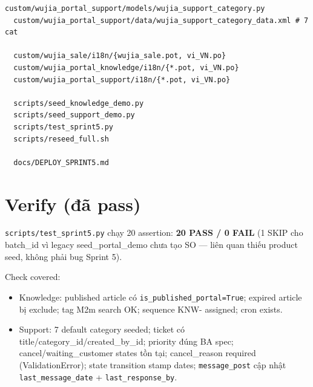 \begin{lstlisting}[style=shell]
  custom/wujia_portal_support/models/wujia_support_category.py
  custom/wujia_portal_support/data/wujia_support_category_data.xml # 7 cat

  custom/wujia_sale/i18n/{wujia_sale.pot, vi_VN.po}
  custom/wujia_portal_knowledge/i18n/{*.pot, vi_VN.po}
  custom/wujia_portal_support/i18n/{*.pot, vi_VN.po}

  scripts/seed_knowledge_demo.py
  scripts/seed_support_demo.py
  scripts/test_sprint5.py
  scripts/reseed_full.sh

  docs/DEPLOY_SPRINT5.md
\end{lstlisting}

\section{Verify (đã pass)}

\texttt{scripts/test\_sprint5.py} chạy 20 assertion: \textbf{20 PASS / 0 FAIL} (1 SKIP cho batch\_id vì legacy seed\_portal\_demo chưa tạo SO --- liên quan thiếu product seed, không phải bug Sprint 5).

Check covered:

\begin{itemize}[leftmargin=*]
    \item Knowledge: published article có \texttt{is\_published\_portal=True}; expired article bị exclude; tag M2m search OK; sequence KNW- assigned; cron exists.
    \item Support: 7 default category seeded; ticket có title/category\_id/created\_by\_id; priority đúng BA spec; cancel/waiting\_customer states tồn tại; cancel\_reason required (ValidationError); state transition stamp dates; \texttt{message\_post} cập nhật \texttt{last\_message\_date} + \texttt{last\_response\_by}.
\end{itemize}

